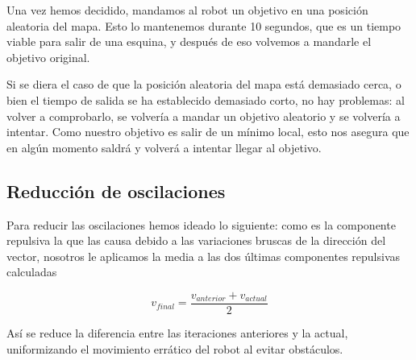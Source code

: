 \documentclass[a4paper, 11pt, titlepage]{article}
\begin{document}
    Una vez hemos decidido, mandamos al robot un objetivo en una posición aleatoria del mapa. Esto lo mantenemos durante 10 segundos, que es un tiempo viable para salir de una esquina, y después de eso volvemos a mandarle el objetivo original.

    Si se diera el caso de que la posición aleatoria del mapa está demasiado cerca, o bien el tiempo de salida se ha establecido demasiado corto, no hay problemas: al volver a comprobarlo, se volvería a mandar un objetivo aleatorio y se volvería a intentar. Como nuestro objetivo es salir de un mínimo local, esto nos asegura que en algún momento saldrá y volverá a intentar llegar al objetivo.

  \subsection{Reducción de oscilaciones}
    Para reducir las oscilaciones hemos ideado lo siguiente: como es la componente repulsiva la que las causa debido a las variaciones bruscas de la dirección del vector, nosotros le aplicamos la media a las dos últimas componentes repulsivas calculadas

    $$ v_{final} = \frac{v_{anterior} + v_{actual}}{2}$$


    Así se reduce la diferencia entre las iteraciones anteriores y la actual, uniformizando el movimiento errático del robot al evitar obstáculos.
\end{document}
